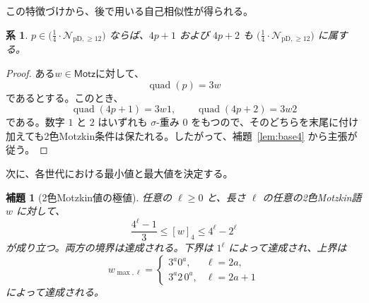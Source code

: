 \documentclass[12pt]{ltjsarticle}
\theoremstyle{plain}
\newtheorem{lemma}[theorem]{補題}
\newtheorem{corollary}[theorem]{系}
\theoremstyle{definition}
\theoremstyle{plain}
\newcommand{\Pset}{%
  \bigl(\tfrac{1}{4}\cdot\mathcal{N}_{\mathrm{pD},\geq 12}\bigr)%
}
\begin{document}
この特徴づけから、後で用いる自己相似性が得られる。

\begin{corollary}\label{cor:Pclosure}
$p\in\Pset$ ならば、$4p+1$ および $4p+2$ も $\Pset$ に属する。
\end{corollary}

\begin{proof}
ある$w\in\mathsf{Motz}$に対して、
\[
 \operatorname{quad}(p)=3w
\]
であるとする。このとき、
\[
 \operatorname{quad}(4p+1)=3w1,
 \qquad
 \operatorname{quad}(4p+2)=3w2
\]
である。数字 $1$ と $2$ はいずれも $\sigma$-重み $0$ をもつので、そのどちらを末尾に付け加えても2色Motzkin条件は保たれる。したがって、補題~\ref{lem:base4} から主張が従う。
\end{proof}

次に、各世代における最小値と最大値を決定する。

\begin{lemma}[2色Motzkin値の極値]\label{lem:extremal}
任意の $\ell\geq0$ と、長さ $\ell$ の任意の2色Motzkin語 $w$ に対して、
\begin{equation}\label{eq:motzkin-extrema}
  \frac{4^{\ell}-1}{3}\leq[w]_4\leq4^{\ell}-2^{\ell}
\end{equation}
が成り立つ。両方の境界は達成される。下界は $1^{\ell}$ によって達成され、上界は
\[
  w_{\max,\ell}=
  \begin{cases}
    3^a0^a,&\ell=2a,\\
    3^a2\,0^a,&\ell=2a+1
  \end{cases}
\]
によって達成される。
\end{lemma}
\end{document}
